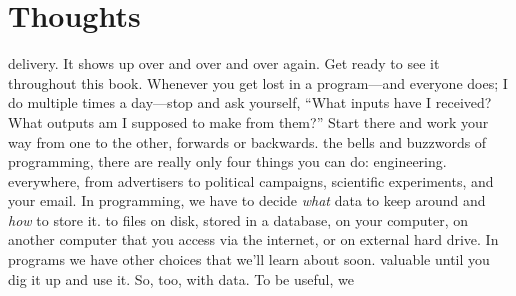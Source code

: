 \chapter{Thoughts}
%
%
delivery. It shows up over and over and over again. Get ready to see it
throughout this book. Whenever you get lost in a program---and everyone does; I
do multiple times a day---stop and ask yourself, ``What inputs have I received?
What outputs am I supposed to make from them?'' Start there and work your way
from one to the other, forwards or backwards.
%
%
%
the bells and buzzwords of programming, there are really only four things you
can do:
%
%
engineering.
%
everywhere, from advertisers to political campaigns, scientific experiments, and
your email. In programming, we have to decide \textit{what} data to keep around
and \textit{how} to store it.
%
to files on disk, stored in a database, on your computer, on another computer
that you access via the internet, or on external hard drive. In programs we have
other choices that we'll learn about soon.
%
valuable until you dig it up and use it. So, too, with data. To be useful, we
